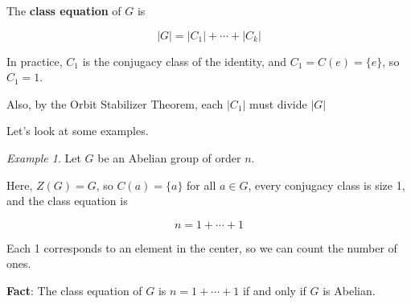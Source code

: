 \documentclass[12pt]{article}
\theoremstyle{remark}
\theoremstyle{remark}
\theoremstyle{remark}
\newtheorem{example}{Example}
\theoremstyle{remark}
\theoremstyle{remark}
\begin{document}
The {\bf class equation} of $G$ is

\[
  |G| = |C_1| + \cdots + |C_k|
\]

In practice, $C_1$ is the conjugacy class of the identity, and $C_1 = C(e) =
\{e\}$, so $C_1 = 1$.

Also, by the Orbit Stabilizer Theorem, each $|C_1|$ must divide $|G|$

Let's look at some examples.

\begin{example}
  Let $G$ be an Abelian group of order $n$.

  Here, $Z(G) = G$, so $C(a) = \{a\}$ for all $a \in G$, every conjugacy class
  is size 1, and the class equation is

  \[
    n = 1 + \cdots + 1
  \]

  Each 1 corresponds to an element in the center, so we can count the number of
  ones.

  {\bf Fact}: The class equation of $G$ is $n = 1 + \cdots + 1$ if and only if $G$
  is Abelian.
\end{example}
\end{document}
